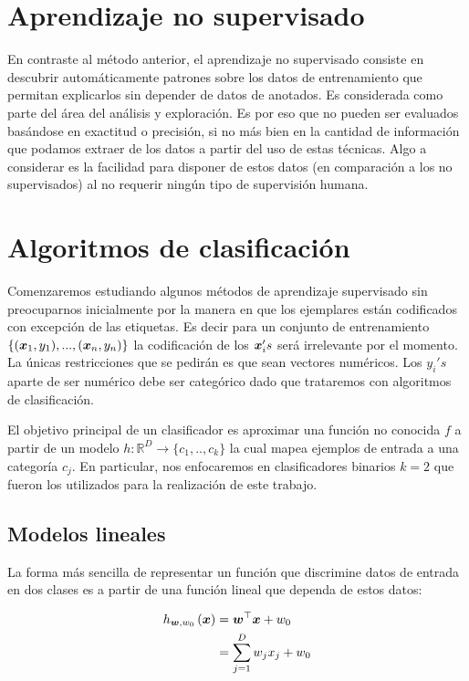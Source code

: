 \section{Aprendizaje no supervisado}

En contraste al método anterior, el aprendizaje no supervisado consiste en
descubrir automáticamente patrones sobre los datos de entrenamiento que permitan
explicarlos sin depender de datos de anotados. Es considerada como parte del
área del análisis y exploración. Es por eso que no pueden ser evaluados
basándose en exactitud o precisión, si no más bien en la cantidad de información
que podamos extraer de los datos a partir del uso de estas técnicas. Algo a
considerar es la facilidad para disponer de estos datos (en comparación a los no
supervisados) al no requerir ningún tipo de supervisión humana.

\section{Algoritmos de clasificación}

Comenzaremos estudiando algunos métodos de aprendizaje supervisado sin preocuparnos
inicialmente por la manera en que los ejemplares están codificados con excepción de las etiquetas. Es decir para un conjunto de entrenamiento $\{(\boldsymbol{x}_1, y_1), ..., (\boldsymbol{x}_n, y_n)\}$ la codificación de los $\boldsymbol{x}_i's$ será irrelevante por el momento. La únicas restricciones que se pedirán es que sean vectores numéricos. Los $y_i's$ aparte de ser
numérico debe ser categórico dado que trataremos con algoritmos de clasificación.

El objetivo principal de un clasificador es aproximar una función no conocida
$f$ a partir de un modelo $h: \mathbb{R}^D \rightarrow \{c_1,.., c_k\}$ la cual
mapea ejemplos de entrada a una categoría $c_j$. En particular, nos enfocaremos
en clasificadores binarios $k = 2$ que fueron los utilizados para la realización
de este trabajo.

\subsection{Modelos lineales}

La forma más sencilla de representar un función que discrimine datos de entrada
en dos clases es a partir de una función lineal que dependa de estos datos:

\begin{align}
    h_{\boldsymbol{w}, w_0}\left( \boldsymbol{x} \right) &= \boldsymbol{w}^{\top} \boldsymbol{x} + w_0  \label{eq:linear_w_bias}\\
                                           &= \sum_{j = 1 }^{D} w_j x_j + w_0 \label{eq:linear_wo_bias}
\end{align}

